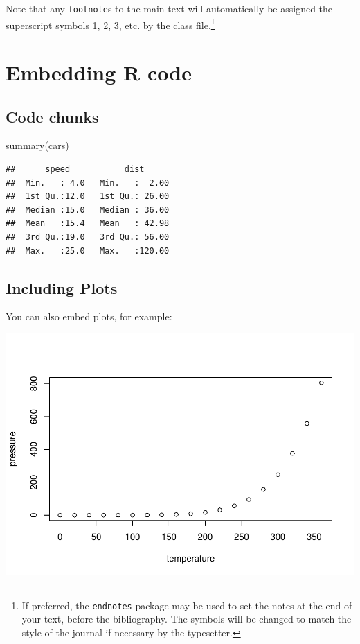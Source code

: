 \documentclass[]{interact}
\theoremstyle{plain}%
\theoremstyle{definition}
\theoremstyle{remark}
\newenvironment{Shaded}{\begin{snugshade}}{\end{snugshade}}
\newcommand{\FunctionTok}[1]{\textcolor[rgb]{0.00,0.00,0.00}{#1}}
\newcommand{\NormalTok}[1]{#1}
\begin{document}
Note that any \texttt{footnote}s to the main text will automatically be
assigned the superscript symbols 1, 2, 3, etc. by the class
file.\footnote{If preferred, the \texttt{endnotes} package may be used
  to set the notes at the end of your text, before the bibliography. The
  symbols will be changed to match the style of the journal if necessary
  by the typesetter.}

\hypertarget{embedding-r-code}{%
\section{Embedding R code}\label{embedding-r-code}}

\hypertarget{code-chunks}{%
\subsection{Code chunks}\label{code-chunks}}

\begin{Shaded}
\begin{Highlighting}[]
\FunctionTok{summary}\NormalTok{(cars)}
\end{Highlighting}
\end{Shaded}

\begin{verbatim}
##      speed           dist       
##  Min.   : 4.0   Min.   :  2.00  
##  1st Qu.:12.0   1st Qu.: 26.00  
##  Median :15.0   Median : 36.00  
##  Mean   :15.4   Mean   : 42.98  
##  3rd Qu.:19.0   3rd Qu.: 56.00  
##  Max.   :25.0   Max.   :120.00
\end{verbatim}

\hypertarget{including-plots}{%
\subsection{Including Plots}\label{including-plots}}

You can also embed plots, for example:

\includegraphics[width=0.8\linewidth]{test1_files/figure-latex/pressure-1}
\end{document}
